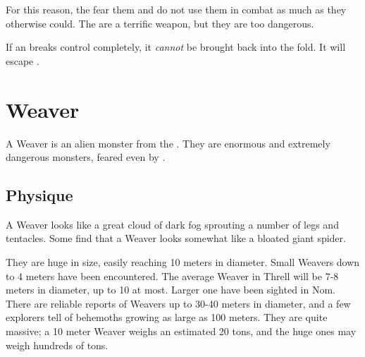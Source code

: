 For this reason, the \resphain{} fear them and do not use them in combat as much as they otherwise could. 
The \umbrae{} are a terrific weapon, but they are too dangerous. 

If an \umbra{} breaks control completely, it \emph{cannot} be brought back into the fold. 
It will escape . 















\section{Weaver}

A Weaver is an alien monster from the \baneworld. They are enormous and extremely dangerous monsters, feared even by \dragons{}. 











\subsection{Physique}
A Weaver looks like a great cloud of dark fog sprouting a number of legs and tentacles. Some find that a Weaver looks somewhat like a bloated giant spider. 

They are huge in size, easily reaching 10 meters in diameter. Small Weavers down to 4 meters have been encountered. The average Weaver in Threll will be 7-8 meters in diameter, up to 10 at most. Larger one have been sighted in Nom. There are reliable reports of Weavers up to 30-40 meters in diameter, and a few explorers tell of behemoths growing as large as 100 meters. They are quite massive; a 10 meter Weaver weighs an estimated 20 tons, and the huge ones may weigh hundreds of tons. 

